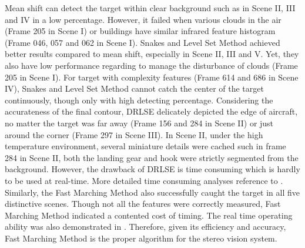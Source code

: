 \documentclass[letterpaper, 10 pt, conference]{ieeeconf}  %
\begin{document}
Mean shift can detect the target within clear background such as in Scene II, III and IV in a low percentage. However, it failed when various clouds in the air (Frame 205 in Scene I) or buildings have similar infrared feature histogram (Frame 046, 057 and 062 in Scene I). Snakes and Level Set Method achieved better results compared to mean shift, especially in Scene II, III and V. Yet, they also have low performance regarding to manage the disturbance of clouds (Frame 205 in Scene I). For target with complexity features (Frame 614 and 686 in Scene IV), Snakes and Level Set Method cannot catch the center of the target continuously, though only with high detecting percentage. Considering the accurateness of the final contour, DRLSE delicately depicted the edge of aircraft, no matter the target was far away (Frame 156 and 284 in Scene II) or just around the corner (Frame 297 in Scene III). In Scene II, under the high temperature environment, several miniature details were cached such in frame 284 in Scene II, 
both the landing gear and hook were strictly segmented from the background. However, the drawback of DRLSE is time consuming which is hardly to be used at real-time. More detailed time consuming analyses reference to \cite{Li2005}. Similarly, the Fast Marching Method also successfully caught the target in all five distinctive scenes. Though not all the features were correctly measured, Fast Marching Method indicated a contented cost of timing. The real time operating ability was also demonstrated in \cite{johnson2007real}. Therefore, given its efficiency and accuracy, Fast Marching Method is the proper algorithm for the stereo vision system.
\end{document}
